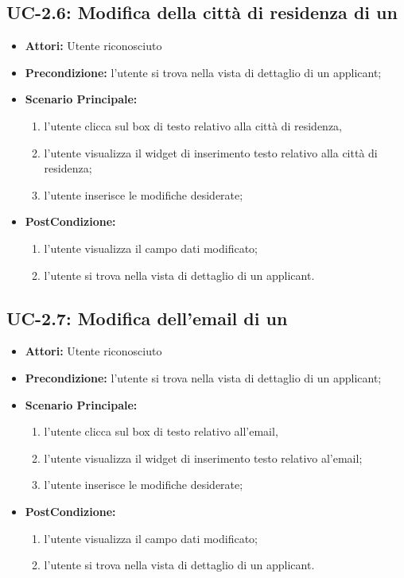 \subsection{UC-2.6: Modifica della città di residenza di un \applicant}
\begin{itemize}
	\item \textbf{Attori:} Utente riconosciuto
	\item \textbf{Precondizione:}  l'utente si trova nella vista di dettaglio di un applicant;
	\item \textbf{Scenario Principale:}
	\begin{enumerate}
		\item l'utente clicca sul box di testo relativo alla città di residenza,
		\item l'utente visualizza il  widget di inserimento testo relativo alla città di residenza;
		\item l'utente inserisce le modifiche desiderate;
	\end{enumerate}
	\item \textbf{PostCondizione:} 
	\begin{enumerate}
		\item l'utente visualizza il campo dati modificato;
		\item l'utente si trova nella vista di dettaglio di un applicant.
	\end{enumerate}
	
\end{itemize}

\subsection{UC-2.7: Modifica dell'email di un \applicant}
\begin{itemize}
	\item \textbf{Attori:} Utente riconosciuto
	\item \textbf{Precondizione:}  l'utente si trova nella vista di dettaglio di un applicant;
	\item \textbf{Scenario Principale:}
	\begin{enumerate}
		\item l'utente clicca sul box di testo relativo all'email,
		\item l'utente visualizza il  widget di inserimento testo relativo al'email;
		\item l'utente inserisce le modifiche desiderate;
	\end{enumerate}
	\item \textbf{PostCondizione:} 
	\begin{enumerate}
		\item l'utente visualizza il campo dati modificato;
		\item l'utente si trova nella vista di dettaglio di un applicant.
	\end{enumerate}
	
\end{itemize}

